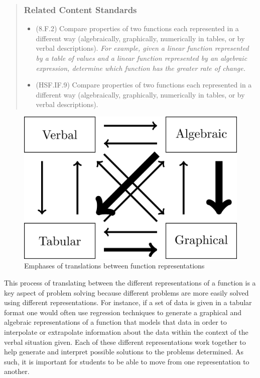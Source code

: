 \documentclass[
]{book}
\providecommand{\tightlist}{%
  \setlength{\itemsep}{0pt}\setlength{\parskip}{0pt}}
\theoremstyle{definition}
\theoremstyle{definition}
\theoremstyle{definition}
\theoremstyle{remark}
\begin{document}
\begin{quote}
\hypertarget{related-content-standards-36}{%
\subsubsection*{Related Content Standards}\label{related-content-standards-36}}

\begin{itemize}
\tightlist
\item
  (8.F.2) Compare properties of two functions each represented in a different way (algebraically, graphically, numerically in tables, or by verbal descriptions). \emph{For example, given a linear function represented by a table of values and a linear function represented by an algebraic expression, determine which function has the greater rate of change.}
\item
  (HSF.IF.9) Compare properties of two functions each represented in a different way (algebraically, graphically, numerically in tables, or by verbal descriptions).
\end{itemize}
\end{quote}

\begin{figure}

{\centering \includegraphics[width=0.45\linewidth]{tikz/representation-emphasis} 

}

\caption{Emphases of translations between function representations}\label{fig:representation-emphasis}
\end{figure}

This process of translating between the different representations of a function is a key aspect of problem solving because different problems are more easily solved using different representations. For instance, if a set of data is given in a tabular format one would often use regression techniques to generate a graphical and algebraic representations of a function that models that data in order to interpolate or extrapolate information about the data within the context of the verbal situation given. Each of these different representations work together to help generate and interpret possible solutions to the problems determined. As such, it is important for students to be able to move from one representation to another.
\end{document}
